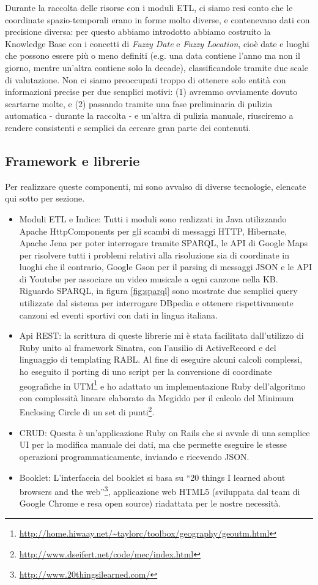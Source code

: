 \documentclass[sigproc-sp.tex]{subfiles}
\begin{document}
Durante la raccolta delle risorse con i moduli ETL, ci siamo resi conto che le coordinate spazio-temporali erano in forme molto diverse, e contenevano dati con precisione diversa: per questo abbiamo introdotto abbiamo costruito la Knowledge Base con i concetti di \textit{Fuzzy Date} e \textit{Fuzzy Location}, cioè date e luoghi che possono essere più o meno definiti (e.g. una data contiene l'anno ma non il giorno, mentre un'altra contiene solo la decade), classificandole tramite due scale di valutazione. Non ci siamo preoccupati troppo di ottenere solo entità con informazioni precise per due semplici motivi: (1) avremmo ovviamente dovuto scartarne molte, e (2) passando tramite una fase preliminaria di pulizia automatica - durante la raccolta - e un'altra di pulizia manuale, riusciremo a rendere consistenti e semplici da cercare gran parte dei contenuti.

\subsection{Framework e librerie}
Per realizzare queste componenti, mi sono avvalso di diverse tecnologie, elencate qui sotto per sezione.
\begin{itemize}
\item Moduli ETL e Indice: Tutti i moduli sono realizzati in Java utilizzando Apache HttpComponents per gli scambi di messaggi HTTP, Hibernate, Apache Jena per poter interrogare tramite SPARQL, le API di Google Maps per risolvere tutti i problemi relativi alla risoluzione sia di coordinate in luoghi che il contrario, Google Gson per il parsing di messaggi JSON e le API di Youtube per associare un video musicale a ogni canzone nella KB. Riguardo SPARQL, in figura \ref{fig:sparql} sono mostrate due semplici query utilizzate dal sistema per interrogare DBpedia e ottenere rispettivamente canzoni ed eventi sportivi con dati in lingua italiana.
\item Api REST: la scrittura di queste librerie mi è stata facilitata dall’utilizzo di Ruby unito al framework Sinatra, con l’ausilio di ActiveRecord e del linguaggio di templating RABL. Al fine di eseguire alcuni calcoli complessi, ho eseguito il porting di uno script per la conversione di coordinate geografiche in UTM\footnote{\url{http://home.hiwaay.net/~taylorc/toolbox/geography/geoutm.html}} e ho adattato un implementazione Ruby dell’algoritmo con complessità lineare elaborato da Megiddo per il calcolo del Minimum Enclosing Circle di un set di punti\footnote{\url{http://www.dseifert.net/code/mec/index.html}}.
\item CRUD: Questa è un’applicazione Ruby on Rails che si avvale di una semplice UI per la modifica manuale dei dati, ma che permette eseguire le stesse operazioni programmaticamente, inviando e ricevendo JSON.
\item Booklet: L’interfaccia del booklet si basa su “20 things I learned about browsers and the web”\footnote{\url{http://www.20thingsilearned.com/}}, applicazione web HTML5 (sviluppata dal team di Google Chrome e resa open source) riadattata per le nostre necessità.
\end{itemize}
\end{document}

